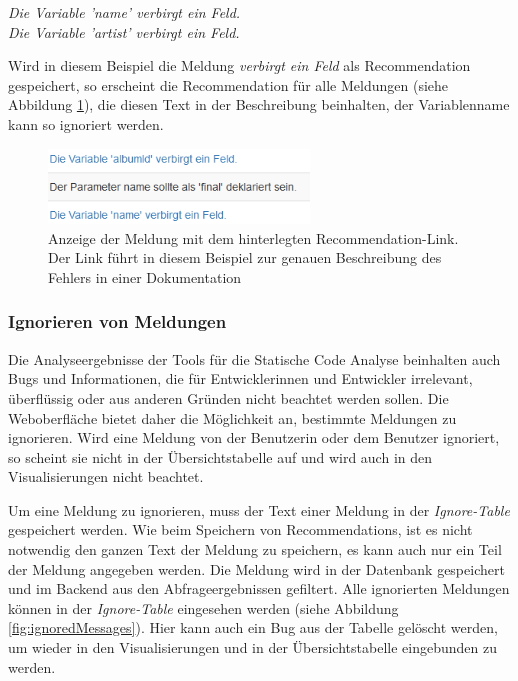 \textit{Die Variable 'name' verbirgt ein Feld.}\\
\textit{Die Variable 'artist' verbirgt ein Feld.}

Wird in diesem Beispiel die Meldung \textit{verbirgt ein Feld} als Recommendation gespeichert, so erscheint die Recommendation für alle Meldungen (siehe Abbildung \ref{fig:recommendations}), die diesen Text in der Beschreibung beinhalten, der Variablenname kann so ignoriert werden. 

\begin{figure}[tp]
  \centering
  \includegraphics[height=2cm]{images/recommendation.PNG}
 \caption[Anzeige der Meldung mit dem hinterlegten Recommendation-Link. Der Link führt in diesem Beispiel zur genauen Beschreibung des Fehlers in einer Dokumentation]{Anzeige der Meldung mit dem hinterlegten Recommendation-Link. Der Link führt in diesem Beispiel zur genauen Beschreibung des Fehlers in einer Dokumentation}
  \label{fig:recommendations}
\end{figure}

\subsubsection{Ignorieren von Meldungen}
Die Analyseergebnisse der Tools für die Statische Code Analyse beinhalten auch Bugs und Informationen, die für Entwicklerinnen und Entwickler irrelevant, überflüssig  oder aus anderen Gründen nicht beachtet werden sollen. Die Weboberfläche bietet daher die Möglichkeit an, bestimmte Meldungen zu ignorieren. Wird eine Meldung von der Benutzerin oder dem Benutzer ignoriert, so scheint sie nicht in der Übersichtstabelle auf und wird auch in den Visualisierungen nicht beachtet. 

Um eine Meldung zu ignorieren, muss der Text einer Meldung in der \textit{Ignore-Table} gespeichert werden. Wie beim Speichern von Recommendations, ist es nicht notwendig den ganzen Text der Meldung zu speichern, es kann auch nur ein Teil der Meldung angegeben werden.  
Die Meldung wird in der Datenbank gespeichert und im Backend aus den Abfrageergebnissen gefiltert. Alle ignorierten Meldungen können in der \textit{Ignore-Table} eingesehen werden (siehe Abbildung \ref{fig:ignoredMessages}). Hier kann auch ein Bug aus der Tabelle gelöscht werden, um wieder in den Visualisierungen und in der Übersichtstabelle eingebunden zu werden.

